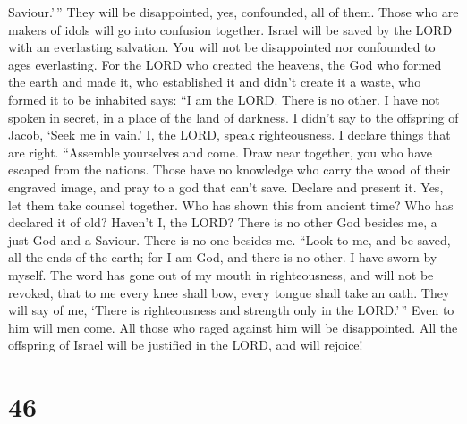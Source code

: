 Saviour.'\,''  They will be disappointed, yes, confounded,
all of them. Those who are makers of idols will go into confusion
together.  Israel will be saved by the LORD with an
everlasting salvation. You will not be disappointed nor confounded to
ages everlasting.  For the LORD who created the heavens,
the God who formed the earth and made it, who established it and didn't
create it a waste, who formed it to be inhabited says: ``I am the LORD.
There is no other.  I have not spoken in secret, in a place
of the land of darkness. I didn't say to the offspring of Jacob, `Seek
me in vain.' I, the LORD, speak righteousness. I declare things that are
right.  ``Assemble yourselves and come. Draw near together,
you who have escaped from the nations. Those have no knowledge who carry
the wood of their engraved image, and pray to a god that can't save.
 Declare and present it. Yes, let them take counsel
together. Who has shown this from ancient time? Who has declared it of
old? Haven't I, the LORD? There is no other God besides me, a just God
and a Saviour. There is no one besides me.  ``Look to me,
and be saved, all the ends of the earth; for I am God, and there is no
other.  I have sworn by myself. The word has gone out of my
mouth in righteousness, and will not be revoked, that to me every knee
shall bow, every tongue shall take an oath.  They will say
of me, `There is righteousness and strength only in the LORD.'\,'' Even
to him will men come. All those who raged against him will be
disappointed.  All the offspring of Israel will be
justified in the LORD, and will rejoice!

\hypertarget{section-45}{%
\section{46}\label{section-45}}

